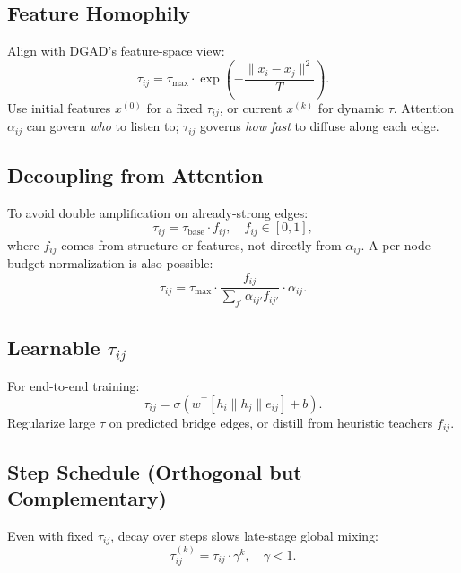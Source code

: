 \documentclass[11pt,a4paper]{report}
\begin{document}
\subsection{Feature Homophily}

Align with DGAD's feature-space view:
\begin{equation}
    \tau_{ij} = \tau_{\max}\cdot \exp\!\left(-\frac{\|x_i - x_j\|^2}{T}\right).
\end{equation}
Use initial features $x^{(0)}$ for a fixed $\tau_{ij}$, or current $x^{(k)}$ for dynamic $\tau$. Attention $\alpha_{ij}$ can govern \emph{who} to listen to; $\tau_{ij}$ governs \emph{how fast} to diffuse along each edge.

\subsection{Decoupling from Attention}

To avoid double amplification on already-strong edges:
\begin{equation}
    \tau_{ij} = \tau_{\mathrm{base}} \cdot f_{ij}, \quad f_{ij} \in [0,1],
\end{equation}
where $f_{ij}$ comes from structure or features, not directly from $\alpha_{ij}$. A per-node budget normalization is also possible:
\begin{equation}
    \tau_{ij} = \tau_{\max}\cdot \frac{f_{ij}}{\sum_{j'} \alpha_{ij'} f_{ij'}}\cdot \alpha_{ij}.
\end{equation}

\subsection{Learnable \texorpdfstring{$\tau_{ij}$}{tau\_ij}}

For end-to-end training:
\begin{equation}
    \tau_{ij} = \sigma\!\left(w^\top [h_i \| h_j \| e_{ij}] + b\right).
\end{equation}
Regularize large $\tau$ on predicted bridge edges, or distill from heuristic teachers $f_{ij}$.

\subsection{Step Schedule (Orthogonal but Complementary)}

Even with fixed $\tau_{ij}$, decay over steps slows late-stage global mixing:
\begin{equation}
    \tau_{ij}^{(k)} = \tau_{ij}\cdot \gamma^k, \quad \gamma < 1.
\end{equation}
\end{document}
